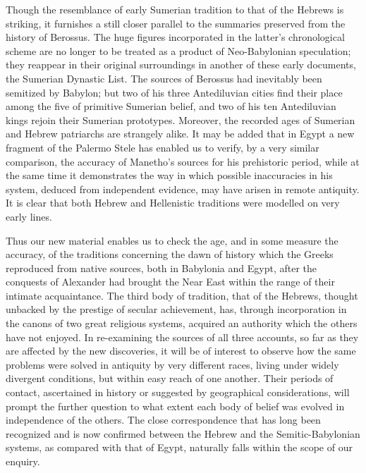 \documentclass[12pt,oneside]{book}
\begin{document}
Though the resemblance of early Sumerian tradition to that of the Hebrews is striking, it furnishes a still closer parallel to the summaries preserved from the history of Berossus. The huge figures incorporated in the latter's chronological scheme are no longer to be treated as a product of Neo-Babylonian speculation; they reappear in their original surroundings in another of these early documents, the Sumerian Dynastic List. The sources of Berossus had inevitably been semitized by Babylon; but two of his three Antediluvian cities find their place among the five of primitive Sumerian belief, and two of his ten Antediluvian kings rejoin their Sumerian prototypes. Moreover, the recorded ages of Sumerian and Hebrew patriarchs are strangely alike. It may be added that in Egypt a new fragment of the Palermo Stele has enabled us to verify, by a very similar comparison, the accuracy of Manetho's sources for his prehistoric period, while at the same time it demonstrates the way in which possible inaccuracies in his system, deduced from independent evidence, may have arisen in remote antiquity. It is clear that both Hebrew and Hellenistic traditions were modelled on very early lines. \par 

Thus our new material enables us to check the age, and in some measure the accuracy, of the traditions concerning the dawn of history which the Greeks reproduced from native sources, both in Babylonia and Egypt, after the conquests of Alexander had brought the Near East within the range of their intimate acquaintance. The third body of tradition, that of the Hebrews, thought unbacked by the prestige of secular achievement, has, through incorporation in the canons of two great religious systems, acquired an authority which the others have not enjoyed. In re-examining the sources of all three accounts, so far as they are affected by the new discoveries, it will be of interest to observe how the same problems were solved in antiquity by very different races, living under widely divergent conditions, but within easy reach of one another. Their periods of contact, ascertained in history or suggested by geographical considerations, will prompt the further question to what extent each body of belief was evolved in independence of the others. The close correspondence that has long been recognized and is now confirmed between the Hebrew and the Semitic-Babylonian systems, as compared with that of Egypt, naturally falls within the scope of our enquiry. \par 
\end{document}
